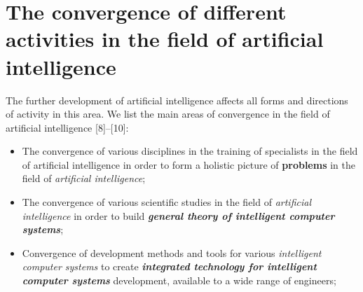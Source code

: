 \documentclass[10pt, a4paper]{proc}
\begin{document}
 \section{The convergence of different activities in the field of artificial intelligence}
  \normalsize
  \quad The further development of artificial intelligence affects all forms and directions of activity in this area. We list the main areas of convergence in the field of artificial intelligence [8]–[10]:
 \begin{itemize}
  \item The convergence of various disciplines in the training of specialists in the field of artificial intelligence in order to form a holistic picture of \textbf{problems} in the field of \textit{artificial intelligence};
  \item The convergence of various scientific studies in the field of \textit{artificial intelligence} in order to build \textbf{\textit{general theory of intelligent computer systems}};
  \item Convergence of development methods and tools for various \textit{intelligent computer systems} to create \textit{\textbf{integrated technology for intelligent computer systems}} development, available to a wide range of engineers;
 \end{itemize}
\end{document}
